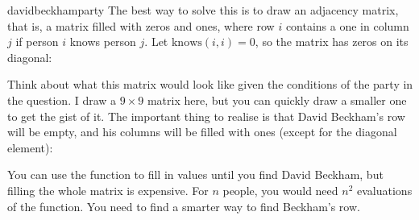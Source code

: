 \begin{answer}{davidbeckhamparty}
The best way to solve this is to draw an adjacency matrix,
that is, a matrix filled with zeros and ones, where
row $i$ contains a one in column $j$ if person $i$ knows person $j$.
Let $\text{knows}(i,i)=0$, so the matrix has zeros on its diagonal:

\begin{center}
\end{center}
Think about what this matrix would look like given the conditions of the party in the question.
I draw a $9 \times 9$ matrix here, but you can quickly draw a smaller one to get the gist of it.
The important thing to realise is that David Beckham’s row will be empty, and his columns will be filled with ones (except for the diagonal element):
\begin{center}
\end{center}
You can use the function to fill in values until you find David Beckham,
but filling the whole matrix is expensive. For $n$ people, you would need $n^2$ evaluations of the function.
You need to find a smarter way to find Beckham's row.


\end{answer}

